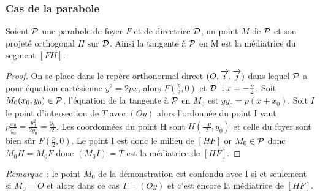 \subsubsection{Cas de la parabole}
\begin{prop}
  Soient $\P$ une parabole de foyer $F$ et de directrice $\Dr$, un point $M$ de $\P$ et son projeté orthogonal $H$ sur $\Dr$. Ainsi la tangente à $\P$ en M est la médiatrice du segment $[FH]$.
\end{prop}
\begin{proof}
  On se place dans le repère orthonormal direct $\rond$ dans lequel $\P$ a pour équation cartésienne $y^2=2px$, alors $F\left(\frac{p}{2},0\right)$ et $\Dr{}~: x=-\frac{p}{2}$. Soit $M_0(x_0,y_0)\in\P$, l'équation de la tangente à $\P$ en $M_0$ est $yy_0=p(x+x_0)$. Soit $I$ le point d'intersection de $T$ avec $(Oy)$ alors l'ordonnée du point I vaut $p\frac{x_0}{y_0}=\frac{y_0^2}{2y_0}=\frac{y_0}{2}$. Les coordonnées du point H sont $H\left(\frac{-p}{2}, y_0\right)$ et celle du foyer sont bien sûr $F\left(\frac{p}{2},0\right)$. Le point I est donc le milieu de $[HF]$ or $M_0\in\P$ donc $M_0H=M_0F$ donc $(M_0I)=T$ est la médiatrice de $[HF]$.
\end{proof}
\emph{Remarque}~: le point $M_0$ de la démonstration est confondu avec I si et seulement si $M_0=O$ et alors dans ce cas $T=(Oy)$ et c'est encore la médiatrice de $[HF]$.

